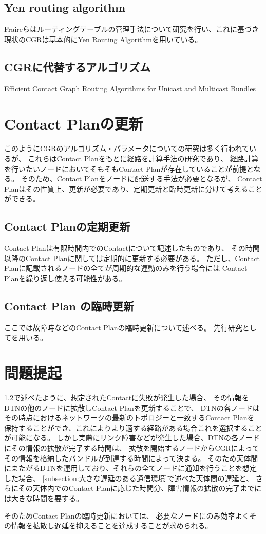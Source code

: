 \subsection{Yen routing algorithm}
\label{sec:Yen routing algorithm}
Fraireらはルーティングテーブルの管理手法について研究を行い、これに基づき現状のCGRは基本的にYen Routing Algorithmを用いている。\cite{FRAIRE2018}

\subsection{CGRに代替するアルゴリズム}
\label{sec:CGRに代替するアルゴリズムの研究}
Efficient Contact Graph Routing Algorithms for Unicast and Multicast Bundles
\cite{DeJonckere2019}


\section{Contact Planの更新}
\label{sec:ContactPlanの更新}
このようにCGRのアルゴリズム・パラメータについての研究は多く行われているが、
これらはContact Planをもとに経路を計算手法の研究であり、
経路計算を行いたいノードにおいてそもそもContact Planが存在していることが前提となる。
そのため、Contact Planをノードに配送する手法が必要となるが、
Contact Planはその性質上、更新が必要であり、定期更新と臨時更新に分けて考えることができる。

\subsection{Contact Planの定期更新}
\label{sec:ContactPlanの定期更新}
Contact Planは有限時間内でのContactについて記述したものであり、
その時間以降のContact Planに関しては定期的に更新する必要がある。
ただし、Contact Planに記載されるノードの全てが周期的な運動のみを行う場合には
Contact Planを繰り返し使える可能性がある。

\subsection{Contact Plan の臨時更新}
\label{sec:ContactPlanの臨時更新}
ここでは故障時などのContact Planの臨時更新について述べる。
先行研究として\cite{Bezirgiannidis2013}を用いる。

\section{問題提起}
\label{sec:ContactPlanの臨時更新の課題}
\ref{sec:ContactPlanの臨時更新}で述べたように、想定されたContactに失敗が発生した場合、
その情報をDTNの他のノードに拡散しContact Planを更新することで、
DTNの各ノードはその時点におけるネットワークの最新のトポロジーと一致するContact Planを
保持することができ、これによりより適する経路がある場合これを選択することが可能になる。
しかし実際にリンク障害などが発生した場合、DTNの各ノードにその情報の拡散が完了する時間は、
拡散を開始するノードからCGRによってその情報を格納したバンドルが到達する時間によって決まる。
そのため天体間にまたがるDTNを運用しており、それらの全てノードに通知を行うことを想定した場合、
\ref{subsection:大きな遅延のある通信環境}で述べた天体間の遅延と、
さらにその天体内でのContact Planに応じた時間分、障害情報の拡散の完了までには大きな時間を要する。

そのためContact Planの臨時更新においては、
必要なノードにのみ効率よくその情報を拡散し遅延を抑えることを達成することが求められる。